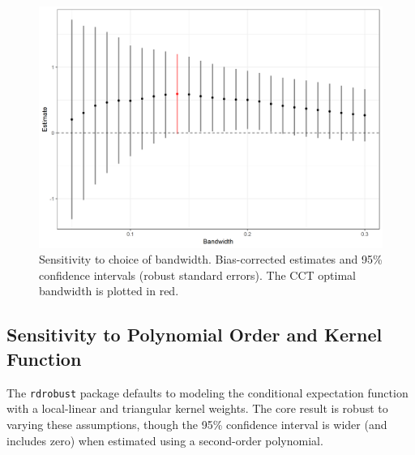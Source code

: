 \documentclass[12pt]{article}
\begin{document}
\begin{appendices}
	
	\begin{figure}[h]
	\centering
	\includegraphics[width=\linewidth]{Figures/bandwidthSensitivity}
	\caption{Sensitivity to choice of bandwidth. Bias-corrected estimates and 95\% confidence intervals (robust standard errors). The CCT optimal bandwidth is plotted in red.}
	\label{fig:bandwidthSensitivity}
	\end{figure}

	\subsection{Sensitivity to Polynomial Order and Kernel Function}

	The \texttt{rdrobust} package defaults to modeling the conditional expectation function with a local-linear and triangular kernel weights. The core result is robust to varying these assumptions, though the 95\% confidence interval is wider (and includes zero) when estimated using a second-order polynomial.
	 

\end{appendices}
\end{document}
